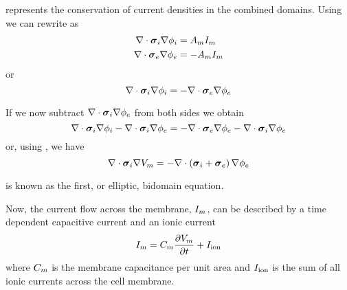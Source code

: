 represents the conservation
of current densities in the combined domains. Using
we can rewrite  as
\begin{align}
  \divergence{}{\intracellularconductivitytensor\gradient{}{\intracellularpotential}}&=
  \membraneareavolumeratio\transmembranecurrent \label{eqn:IntraCellularCurrentDensityConservation} \\
  \divergence{}{\extracellularconductivitytensor\gradient{}{\extracellularpotential}}&=
  -\membraneareavolumeratio\transmembranecurrent \label{eqn:ExtraCellularCurrentDensityConservation} 
\end{align}
or
\begin{equation}
  \divergence{}{\intracellularconductivitytensor\gradient{}{\intracellularpotential}}=
  -\divergence{}{\extracellularconductivitytensor\gradient{}{\extracellularpotential}}  
\end{equation}

If we now subtract
$\divergence{}{\intracellularconductivitytensor\gradient{}{\extracellularpotential}}$
from both sides we obtain
\begin{equation}
  \divergence{}{\intracellularconductivitytensor\gradient{}{\intracellularpotential}}-
  \divergence{}{\intracellularconductivitytensor\gradient{}{\extracellularpotential}}=
  -\divergence{}{\extracellularconductivitytensor\gradient{}{\extracellularpotential}}-
  \divergence{}{\intracellularconductivitytensor\gradient{}{\extracellularpotential}}
\end{equation}
or, using , we have
\begin{equation}
  \divergence{}{\intracellularconductivitytensor\gradient{}{\transmembranevoltage}}=
  -\divergence{}{\pbrac{\intracellularconductivitytensor+\extracellularconductivitytensor}\gradient{}{\extracellularpotential}}
  \label{eqn:FirstBidomainEquation}
\end{equation}

 is known as the first, or elliptic, bidomain equation.

Now, the current flow across the membrane, $ { I }_{m} $,
can be described by a time dependent capacitive current and an ionic
current \ie
\begin{equation}
  \transmembranecurrent=\membranecapacitance\delby{\transmembranevoltage}{t}+\ioniccurrent
  \label{eqn:TransMembraneCurrentDefinition}
\end{equation}
where $ C_{m} $ is the membrane capacitance per unit
area and $ { I }_{\text{ion}} $ is the sum of all ionic currents across the
cell membrane.

